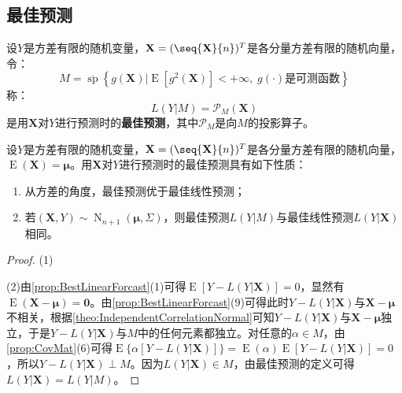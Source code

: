 \subsection{最佳预测}
\begin{definition}
	设$Y$是方差有限的随机变量，$\mathbf{X}=(\seq{\mathbf{X}}{n})^T$是各分量方差有限的随机向量，令：
	\begin{equation*}
		M=\overline{\operatorname{sp}}\left\{g(\mathbf{X})|\operatorname{E}[g^2(\mathbf{X})]<+\infty,\;g(\cdot)\text{是可测函数}\right\}
	\end{equation*}
	称：
	\begin{equation*}
		L(Y|M)=\mathcal{P}_M(\mathbf{X})
	\end{equation*}
	是用$\mathbf{X}$对$Y$进行预测时的\textbf{最佳预测}，其中$\mathcal{P}_M$是向$M$的投影算子。
\end{definition}
\begin{property}
	设$Y$是方差有限的随机变量，$\mathbf{X}=(\seq{\mathbf{X}}{n})^T$是各分量方差有限的随机向量，$\operatorname{E}(\mathbf{X})=\boldsymbol{\mu}$。用$\mathbf{X}$对$Y$进行预测时的最佳预测具有如下性质：
	\begin{enumerate}
		\item 从方差的角度，最佳预测优于最佳线性预测；
		\item 若$(\mathbf{X},Y)\sim\operatorname{N}_{n+1}(\boldsymbol{\mu},\Sigma)$，则最佳预测$L(Y|M)$与最佳线性预测$L(Y|\mathbf{X})$相同。
	\end{enumerate}
\end{property}
\begin{proof}
	(1)\par
	(2)由\cref{prop:BestLinearForcast}(1)可得$\operatorname{E}[Y-L(Y|\mathbf{X})]=0$，显然有$\operatorname{E}(\mathbf{X}-\boldsymbol{\mu})=\mathbf{0}$。由\cref{prop:BestLinearForcast}(9)可得此时$Y-L(Y|\mathbf{X})$与$\mathbf{X}-\boldsymbol{\mu}$不相关，根据\cref{theo:IndependentCorrelationNormal}可知$Y-L(Y|\mathbf{X})$与$\mathbf{X}-\boldsymbol{\mu}$独立，于是$Y-L(Y|\mathbf{X})$与$M$中的任何元素都独立。对任意的$\alpha\in M$，由\cref{prop:CovMat}(6)可得$\operatorname{E}\{\alpha[Y-L(Y|\mathbf{X})]\}=\operatorname{E}(\alpha)\operatorname{E}[Y-L(Y|\mathbf{X})]=0$，所以$Y-L(Y|\mathbf{X})\perp M$。因为$L(Y|\mathbf{X})\in M$，由最佳预测的定义可得$L(Y|\mathbf{X})=L(Y|M)$。
\end{proof}
